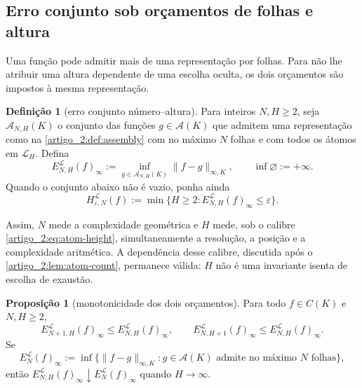 \documentclass[12pt,a4paper]{article}
\theoremstyle{preciso}
\theoremstyle{definition}
\newcommand{\Aclass}{\mathcal{A}}
\newcommand{\Library}{\mathcal{L}}
\theoremstyle{preciso}
\theoremstyle{preciso}
\theoremstyle{preciso}
\newtheorem{proposition}[teorema]{Proposição}
\theoremstyle{preciso}
\theoremstyle{definition}
\newtheorem{definition}[teorema]{Definição}
\theoremstyle{preciso}
\theoremstyle{definition}
\theoremstyle{preciso}
\theoremstyle{preciso}
\theoremstyle{definition}
\begin{document}
\subsection{Erro conjunto sob orçamentos de folhas e altura}
\label{artigo_2:subsec:joint-budget}

Uma função pode admitir mais de uma representação por folhas. Para não
lhe atribuir uma altura dependente de uma escolha oculta, os dois
orçamentos são impostos à mesma representação.

\begin{definition}[erro conjunto número--altura]\label{map:artigo_2:3.13}
\label{artigo_2:def:joint-error}
Para inteiros $N,H\ge2$, seja $\Aclass_{N,H}(K)$ o conjunto das funções
$g\in\Aclass(K)$ que admitem uma representação como na
\cref{artigo_2:def:assembly} com no máximo $N$ folhas e com todos os átomos em
$\Library_H$. Defina
\begin{equation}
 E_{N,H}^{\Library}(f)_\infty
 :=\inf_{g\in\Aclass_{N,H}(K)}\|f-g\|_{\infty,K},
 \qquad \inf\varnothing:=+\infty.
 \label{artigo_2:eq:joint-error}
\end{equation}
Quando o conjunto abaixo não é vazio, ponha ainda
\begin{equation}
 H_{\varepsilon,N}^{\Library}(f)
 :=\min\{H\ge2:E_{N,H}^{\Library}(f)_\infty\le\varepsilon\}.
 \label{artigo_2:eq:height-for-accuracy}
\end{equation}
\end{definition}

Assim, $N$ mede a complexidade geométrica e $H$ mede, sob o calibre
\eqref{artigo_2:eq:atom-height}, simultaneamente a resolução, a posição e a complexidade
aritmética. A dependência desse calibre, discutida após o
\cref{artigo_2:lem:atom-count}, permanece válida: $H$ não é uma invariante isenta de
escolha de exaustão.

\begin{proposition}[monotonicidade dos dois orçamentos]\label{map:artigo_2:3.14}
\label{artigo_2:prop:joint-error-monotonicity}
Para todo $f\in C(K)$ e $N,H\ge2$,
\begin{equation}
 E_{N+1,H}^{\Library}(f)_\infty\le E_{N,H}^{\Library}(f)_\infty,
 \qquad
 E_{N,H+1}^{\Library}(f)_\infty\le E_{N,H}^{\Library}(f)_\infty.
 \label{artigo_2:eq:joint-error-monotonicity}
\end{equation}
Se
\[
 E_N^{\Library}(f)_\infty
 :=\inf\{\|f-g\|_{\infty,K}:g\in\Aclass(K)
       \text{ admite no máximo $N$ folhas}\},
\]
então $E_{N,H}^{\Library}(f)_\infty\downarrow
E_N^{\Library}(f)_\infty$ quando $H\to\infty$.
\end{proposition}
\end{document}
